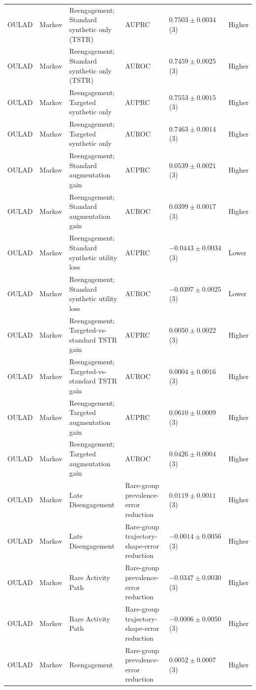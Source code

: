 \begin{longtable}{@{}p{2.25cm}p{2.05cm}p{4.7cm}p{5.0cm}p{2.6cm}p{1.25cm}@{}}
OULAD & Markov & Reengagement; Standard synthetic only (TSTR) & AUPRC & $0.7503 \mathbin{\pm} 0.0034$ (3) & Higher \\
OULAD & Markov & Reengagement; Standard synthetic only (TSTR) & AUROC & $0.7459 \mathbin{\pm} 0.0025$ (3) & Higher \\
OULAD & Markov & Reengagement; Targeted synthetic only & AUPRC & $0.7553 \mathbin{\pm} 0.0015$ (3) & Higher \\
OULAD & Markov & Reengagement; Targeted synthetic only & AUROC & $0.7463 \mathbin{\pm} 0.0014$ (3) & Higher \\
OULAD & Markov & Reengagement; Standard augmentation gain & AUPRC & $0.0539 \mathbin{\pm} 0.0021$ (3) & Higher \\
OULAD & Markov & Reengagement; Standard augmentation gain & AUROC & $0.0399 \mathbin{\pm} 0.0017$ (3) & Higher \\
OULAD & Markov & Reengagement; Standard synthetic utility loss & AUPRC & $-0.0443 \mathbin{\pm} 0.0034$ (3) & Lower \\
OULAD & Markov & Reengagement; Standard synthetic utility loss & AUROC & $-0.0397 \mathbin{\pm} 0.0025$ (3) & Lower \\
OULAD & Markov & Reengagement; Targeted-vs-standard TSTR gain & AUPRC & $0.0050 \mathbin{\pm} 0.0022$ (3) & Higher \\
OULAD & Markov & Reengagement; Targeted-vs-standard TSTR gain & AUROC & $0.0004 \mathbin{\pm} 0.0016$ (3) & Higher \\
OULAD & Markov & Reengagement; Targeted augmentation gain & AUPRC & $0.0610 \mathbin{\pm} 0.0009$ (3) & Higher \\
OULAD & Markov & Reengagement; Targeted augmentation gain & AUROC & $0.0426 \mathbin{\pm} 0.0004$ (3) & Higher \\
OULAD & Markov & Late Disengagement & Rare-group prevalence-error reduction & $0.0119 \mathbin{\pm} 0.0011$ (3) & Higher \\
OULAD & Markov & Late Disengagement & Rare-group trajectory-shape-error reduction & $-0.0014 \mathbin{\pm} 0.0056$ (3) & Higher \\
OULAD & Markov & Rare Activity Path & Rare-group prevalence-error reduction & $-0.0347 \mathbin{\pm} 0.0030$ (3) & Higher \\
OULAD & Markov & Rare Activity Path & Rare-group trajectory-shape-error reduction & $-0.0006 \mathbin{\pm} 0.0050$ (3) & Higher \\
OULAD & Markov & Reengagement & Rare-group prevalence-error reduction & $0.0052 \mathbin{\pm} 0.0007$ (3) & Higher \\

\end{longtable}
